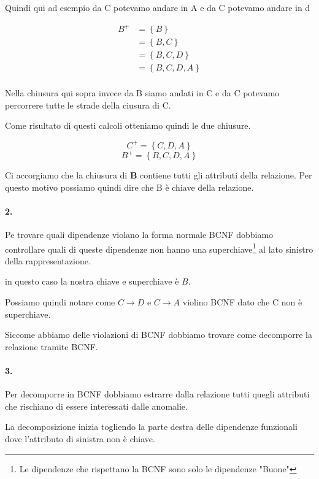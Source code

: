 \begin{exmp}
    Quindi qui ad esempio da C potevamo andare in A e da C potevamo andare in d

    \begin{equation}
        \begin{split}
            B^+&= \left\{  B \right\}\\
            &= \left\{  B,C \right\}\\
            &= \left\{  B,C,D \right\}\\
            &= \left\{  B,C,D,A \right\}\\
        \end{split}
    \end{equation}

    Nella chiusura qui sopra invece da B siamo andati in C e da C potevamo percorrere tutte le strade della ciusura di C.

    Come risultato di questi calcoli otteniamo quindi le due chiusure.

    \[C^+= \left\{ C,D,A \right\} \] \[ B^+= \left\{  B,C,D,A \right\}\]

    Ci accorgiamo che la chiusura di \textbf{B} contiene tutti gli attributi della relazione. Per questo motivo possiamo quindi dire che B è chiave della relazione.

    \paragraph{2.}

    Pe trovare quali dipendenze violano la forma normale BCNF dobbiamo controllare quali di queste dipendenze non hanno una superchiave\footnote{Le dipendenze che rispettano la BCNF sono solo le dipendenze "Buone"} al lato sinistro della rappresentazione.

    in questo caso la nostra chiave e superchiave è $B$. 

    Possiamo quindi notare come $C \rightarrow D$ e $C \rightarrow A$ violino BCNF dato che C non è superchiave.

    Siccome abbiamo delle violazioni di BCNF dobbiamo trovare come decomporre la relazione tramite BCNF.

    \paragraph{3.} Per decomporre in BCNF dobbiamo estrarre dalla relazione tutti quegli attributi che rischiano di essere interessati dalle anomalie.

    La decomposizione inizia togliendo la parte destra delle dipendenze funzionali dove l'attributo di sinistra non è chiave.


\end{exmp}
